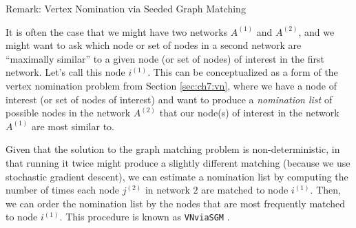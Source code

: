 \begin{floatingbox}[h]\caption{Remark: Vertex Nomination via Seeded Graph Matching}
It is often the case that we might have two networks $A^{(1)}$ and $A^{(2)}$, and we might want to ask which node or set of nodes in a second network are ``maximally similar'' to a given node (or set of nodes) of interest in the first network. Let's call this node $i^{(1)}$. This can be conceptualized as a form of the vertex nomination problem from Section \ref{sec:ch7:vn}, where we have a node of interest (or set of nodes of interest) and want to produce a \textit{nomination list} of possible nodes in the network $A^{(2)}$ that our node(s) of interest in the network $A^{(1)}$ are most similar to. 

Given that the solution to the graph matching problem is non-deterministic, in that running it twice might produce a slightly different matching (because we use stochastic gradient descent), we can estimate a nomination list by computing the number of times each node $j^{(2)}$ in network $2$ are matched to node $i^{(1)}$. Then, we can order the nomination list by the nodes that are most frequently matched to node $i^{(1)}$. This procedure is known as \texttt{VNviaSGM} \cite{Patsolic2020Jun}.
\end{floatingbox}

\newpage
